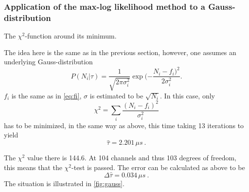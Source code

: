 \documentclass[english,  %
parskip=full,   %
headsepline]{scrartcl}
\newcommand{\mus}{\,\si{\mu s\:}}
\begin{document}
\subsubsection{Application of the max-log likelihood method to a Gauss-distribution}
\begin{floatingfigure}{0.5\linewidth}
 \centering
    
    \caption{The $\chi^2$-function around its minimum.}
    \label{fig:gauss}
\end{floatingfigure}
The idea here is the same as in the previous section, however, one assumes an underlying Gauss-distribution \[P(N_i|\tau)=\dfrac{1}{\sqrt{2\pi\sigma_i^2}}\exp{(-\dfrac{N_i-f_i)^2}{2\sigma_i^2}}.\] $f_i$ is the same as in \cref{eq:fi}, $\sigma$ is estimated to be $\sqrt{N_i}$. In this case, only 
\[
\chi^2=\sum_i\frac{(N_i-f_i)^2}{\sigma_i^2}
\]
has to be minimized, in the same way as above, this time taking 13 iterations to yield
\[
\hat{\tau}=2.201\mus.
\]

The $\chi^2$ value there is 144.6. At 104 channels and thus 103 degrees of freedom, this means that the $\chi^2$-test is passed. The error can be calculated as above to be 
\[
\Delta \hat{\tau} = 0.034\mus.
\]
The situation is illustrated in \cref{fig:gauss}.
\end{document}
